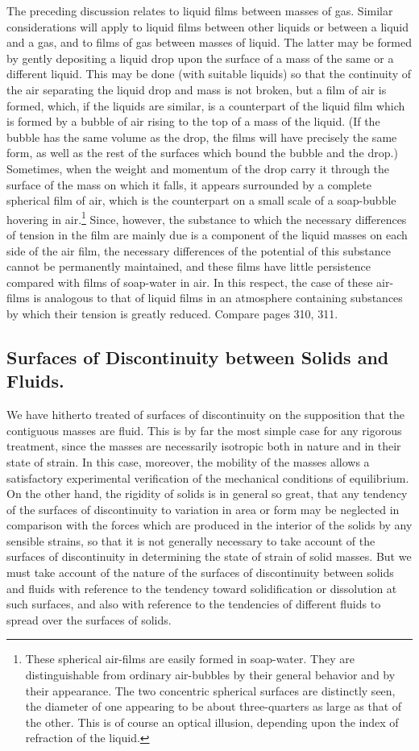 \documentclass[12pt]{memoir}
\begin{document}
The preceding discussion relates to liquid films between masses of gas. Similar considerations will apply to liquid films between other liquids or between a liquid and a gas, and to films of gas between masses of liquid. The latter may be formed by gently depositing a liquid drop upon the surface of a mass of the same or a different liquid. This may be done (with suitable liquids) so that the continuity of the air separating the liquid drop and mass is not broken, but a film of air is formed, which, if the liquids are similar, is a counterpart of the liquid film which is formed by a bubble of air rising to the top of a mass of the liquid. (If the bubble has the same volume as the drop, the films will have precisely the same form, as well as the rest of the surfaces which bound the bubble and the drop.) Sometimes, when the weight and momentum of the drop carry it through the surface of the mass on which it falls, it appears surrounded by a complete spherical film of air, which is the counterpart on a small scale of a soap-bubble hovering in air.\footnote{These spherical air-films are easily formed in soap-water. They are distinguishable from ordinary air-bubbles by their general behavior and by their appearance. The two concentric spherical surfaces are distinctly seen, the diameter of one appearing to be about three-quarters as large as that of the other. This is of course an optical illusion, depending upon the index of refraction of the liquid.} Since, however, the substance to which the necessary differences of tension in the film are mainly due is a component of the liquid masses on each side of the air film, the necessary differences of the potential of this substance cannot be permanently maintained, and these films have little persistence compared with films of soap-water in air. In this respect, the case of these air-films is analogous to that of liquid films in an atmosphere containing substances by which their tension is greatly reduced. Compare pages 310, 311.
\subsection{Surfaces of Discontinuity between Solids and Fluids.}
We have hitherto treated of surfaces of discontinuity on the supposition that the contiguous masses are fluid. This is by far the most simple case for any rigorous treatment, since the masses are necessarily isotropic both in nature and in their state of strain. In this case, moreover, the mobility of the masses allows a satisfactory experimental verification of the mechanical conditions of equilibrium. On the other hand, the rigidity of solids is in general so great, that any tendency of the surfaces of discontinuity to variation in area or form may be neglected in comparison with the forces which are produced in the interior of the solids by any sensible strains, so that it is not generally necessary to take account of the surfaces of discontinuity in determining the state of strain of solid masses. But we must take account of the nature of the surfaces of discontinuity between solids and fluids with reference to the tendency toward solidification or dissolution at such surfaces, and also with reference to the tendencies of different fluids to spread over the surfaces of solids.
\end{document}

